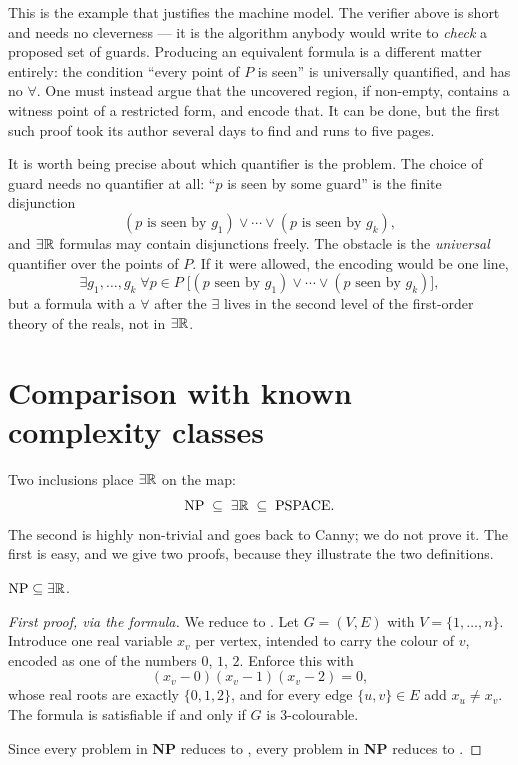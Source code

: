 \begin{intuition}
This is the example that justifies the machine model. The verifier above is
short and needs no cleverness --- it is the algorithm anybody would write to
\emph{check} a proposed set of guards. Producing an equivalent \ETR{} formula
is a different matter entirely: the condition ``every point of $P$ is seen'' is
universally quantified, and \ETR{} has no $\forall$. One must instead argue that
the uncovered region, if non-empty, contains a witness point of a restricted
form, and encode that. It can be done, but the first such proof took its author
several days to find and runs to five pages.

It is worth being precise about which quantifier is the problem. The choice of
guard needs no quantifier at all: ``$p$ is seen by some guard'' is the finite
disjunction
\[ (\text{$p$ is seen by } g_1) \vee \cdots \vee (\text{$p$ is seen by } g_k), \]
and $\exists\mathbb{R}$ formulas may contain disjunctions freely. The obstacle is the
\emph{universal} quantifier over the points of $P$. If it were allowed, the
encoding would be one line,
\[ \exists g_1,\ldots,g_k \; \forall p \in P \;
   \bigl[(\text{$p$ seen by } g_1) \vee \cdots \vee
         (\text{$p$ seen by } g_k)\bigr], \]
but a formula with a $\forall$ after the $\exists$ lives in the second level of
the first-order theory of the reals, not in $\exists\mathbb{R}$.
\end{intuition}

\section{Comparison with known complexity classes}
\label{sec:np-in-er}

Two inclusions place $\exists\mathbb{R}$ on the map:
\[ \mathrm{NP} \;\subseteq\; \exists\mathbb{R} \;\subseteq\; \mathrm{PSPACE}. \]
The second is highly non-trivial and goes back to Canny; we do not prove it.
The first is easy, and we give two proofs, because they illustrate the two
definitions.

\begin{lemma}\label{lem:np-in-er}
$\mathrm{NP} \subseteq \exists\mathbb{R}$.
\end{lemma}

\begin{proof}[First proof, via the formula]
We reduce \ThreeCol{} to \ETR{}. Let $G = (V,E)$ with $V = \{1,\ldots,n\}$.
Introduce one real variable $x_v$ per vertex, intended to carry the colour of
$v$, encoded as one of the numbers $0$, $1$, $2$. Enforce this with
\[ (x_v - 0)(x_v - 1)(x_v - 2) = 0, \]
whose real roots are exactly $\{0,1,2\}$, and for every edge $\{u,v\} \in E$ add
$x_u \ne x_v$. The formula is satisfiable if and only if $G$ is $3$-colourable.

Since every problem in \textbf{NP} reduces to \ThreeCol{}, every problem in
\textbf{NP} reduces to \ETR{}.
\end{proof}

